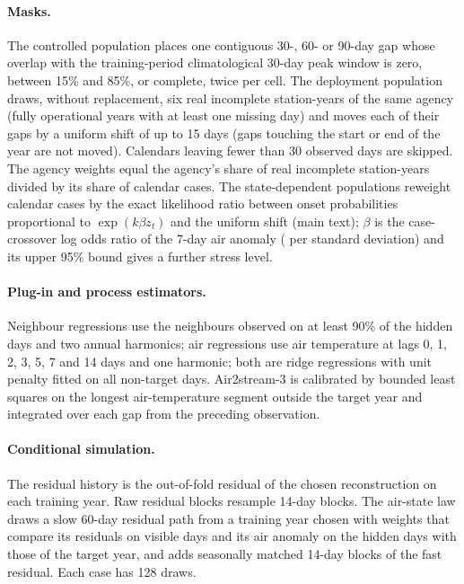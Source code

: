 \documentclass[draft]{agujournal2025}
\begin{document}
\paragraph{Masks.} The controlled population places one contiguous 30-, 60- or 90-day gap whose overlap with the training-period climatological 30-day peak window is zero, between 15\% and 85\%, or complete, twice per cell. The deployment population draws, without replacement, six real incomplete station-years of the same agency (fully operational years with at least one missing day) and moves each of their gaps by a uniform shift of up to 15 days (gaps touching the start or end of the year are not moved). Calendars leaving fewer than 30 observed days are skipped. The agency weights equal the agency's share of real incomplete station-years divided by its share of calendar cases. The state-dependent populations reweight calendar cases by the exact likelihood ratio between onset probabilities proportional to $\exp(k\beta z_t)$ and the uniform shift (main text); $\beta$ is the case-crossover log odds ratio of the 7-day air anomaly (\TOrOnset{} per standard deviation) and its upper 95\% bound gives a further stress level.

\paragraph{Plug-in and process estimators.} Neighbour regressions use the neighbours observed on at least 90\% of the hidden days and two annual harmonics; air regressions use air temperature at lags 0, 1, 2, 3, 5, 7 and 14 days and one harmonic; both are ridge regressions with unit penalty fitted on all non-target days. Air2stream-3 is calibrated by bounded least squares on the longest air-temperature segment outside the target year and integrated over each gap from the preceding observation.

\paragraph{Conditional simulation.} The residual history is the out-of-fold residual of the chosen reconstruction on each training year. Raw residual blocks resample 14-day blocks. The air-state law draws a slow 60-day residual path from a training year chosen with weights that compare its residuals on visible days and its air anomaly on the hidden days with those of the target year, and adds seasonally matched 14-day blocks of the fast residual. Each case has 128 draws.
\end{document}
